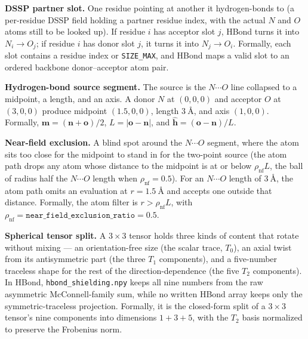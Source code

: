 \documentclass[11pt]{article}
\newcommand{\code}[1]{\texttt{#1}}
\begin{document}
\textbf{DSSP partner slot.} One residue pointing at another it hydrogen-bonds to
(a per-residue DSSP field holding a partner residue index, with the actual \(N\)
and \(O\) atoms still to be looked up). If residue \(i\)
has acceptor slot \(j\), HBond turns it into \(N_i\to O_j\); if residue \(i\)
has donor slot \(j\), it turns it into \(N_j\to O_i\). Formally, each slot
contains a residue index or \code{SIZE\_MAX}, and HBond maps a valid slot to an
ordered backbone donor--acceptor atom pair.

\textbf{Hydrogen-bond source segment.} The source is the \(N\cdots O\) line
collapsed to a midpoint, a length, and an axis. A donor \(N\) at
\((0,0,0)\) and acceptor \(O\) at \((3,0,0)\) produce midpoint
\((1.5,0,0)\), length \(\SI{3}{\angstrom}\), and axis \((1,0,0)\). Formally,
\(\bm m=(\bm n+\bm o)/2\), \(L=|\bm o-\bm n|\), and
\(\hat{\bm h}=(\bm o-\bm n)/L\).

\textbf{Near-field exclusion.} A blind spot around the \(N\cdots O\) segment,
where the atom sits too close for the midpoint to stand in for the two-point
source (the atom path drops any atom whose distance to the midpoint is at or
below \(\rho_{\mathrm{nf}}L\), the ball of radius half the \(N\cdots O\) length
when \(\rho_{\mathrm{nf}}=0.5\)). For an \(N\cdots O\)
length of \(\SI{3}{\angstrom}\), the atom path omits an evaluation at
\(r=\SI{1.5}{\angstrom}\) and accepts one outside that distance. Formally, the
atom filter is \(r>\rho_{\mathrm{nf}}L\), with
\(\rho_{\mathrm{nf}}=\code{near\_field\_exclusion\_ratio}=0.5\).

\textbf{Spherical tensor split.} A \(3\times3\) tensor holds three kinds of
content that rotate without mixing --- an orientation-free size (the scalar
trace, \(T_0\)), an axial twist from its antisymmetric part (the three \(T_1\)
components), and a five-number traceless shape for the rest of the
direction-dependence (the five \(T_2\) components). In HBond,
\code{hbond\_shielding.npy} keeps all nine
numbers from the raw asymmetric McConnell-family sum, while no written HBond
array keeps only the symmetric-traceless projection. Formally, it is the
closed-form split of a \(3\times3\) tensor's nine components into dimensions
\(1+3+5\), with the \(T_2\) basis normalized to preserve the Frobenius norm.
\end{document}
